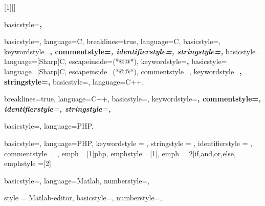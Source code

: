 [1][]
   {\lstset{#1}\pagebreak[0]}{\pagebreak[0]}

\captionsetup[lstlisting]{format=listing,labelfont=white,textfont=white,font= scriptsize}


	{
	basicstyle=\scriptsize\bf\ttfamily,
	}
   
	{
	basicstyle=\scriptsize,
	language=C,
	}
	{
  	breaklines=true,
  	language=C,
  	basicstyle=\scriptsize,
  	keywordstyle=\bfseries\color{green!40!black},
  	commentstyle=\itshape\color{purple!40!black},
  	identifierstyle=\color{blue},
  	stringstyle=\color{orange},
    }
	{
	basicstyle=\scriptsize
	language=[Sharp]C,
	escapeinside={(*@}{@*)},
	keywordstyle=\bfseries,
	}
	{
	basicstyle=\scriptsize
	language=[Sharp]C,
	escapeinside={(*@}{@*)},
	commentstyle=\color{greencomments},
	keywordstyle=\color{bluekeywords}\bfseries,
	stringstyle=\color{redstrings},
	}
	{
	basicstyle=\scriptsize,
	language=C++,
 	}
 	
	{
  	breaklines=true,
  	language=C++,
  	basicstyle=\scriptsize,
  	keywordstyle=\bfseries\color{green!40!black},
  	commentstyle=\itshape\color{purple!40!black},
  	identifierstyle=\color{blue},
  	stringstyle=\color{orange},
    }
    
	{
	basicstyle=\scriptsize,
	language=PHP,
	}
	
	{
	basicstyle=\scriptsize,
	language=PHP,
	keywordstyle    = \color{dkblue},
  	stringstyle     = \color{red},
  	identifierstyle = \color{dkgreen},
  	commentstyle    = \color{gray},
  	emph            =[1]{php},
  	emphstyle       =[1]\color{black},
  	emph            =[2]{if,and,or,else},
  	emphstyle       =[2]\color{dkyellow}
  }
  
	{
	basicstyle=\scriptsize,
	language=Matlab,
	numberstyle=\tiny\ttfamily\color{gray75},
	}
	
	{
	style = Matlab-editor,
	basicstyle=\scriptsize,
	numberstyle=\tiny\ttfamily\color{gray75},
	}
	
